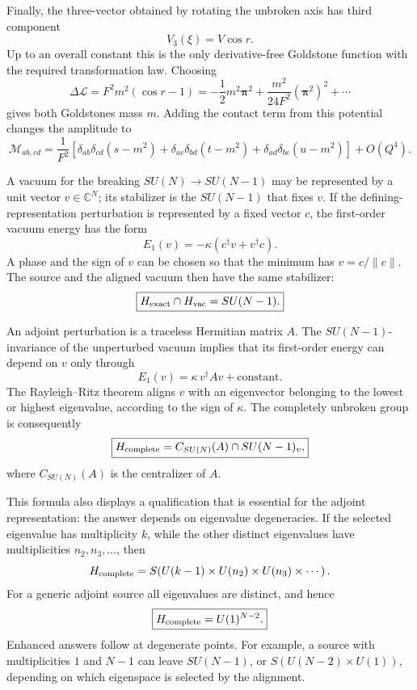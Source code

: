 \begin{enumerate}
  Finally, the three-vector obtained by rotating the unbroken axis has
  third component
  \[
    V_3(\xi)=V\cos r.
  \]
  Up to an overall constant this is the only derivative-free Goldstone
  function with the required transformation law.  Choosing
  \[
    \Delta\mathcal L=F^2m^2(\cos r-1)
      =-\frac12m^2\boldsymbol\pi^2
       +\frac{m^2}{24F^2}(\boldsymbol\pi^2)^2+\cdots
  \]
  gives both Goldstones mass \(m\).  Adding the contact term from this
  potential changes the amplitude to
  \[
    \boxed{\mathcal M_{ab,cd}
      =\frac1{F^2}\left[
       \delta_{ab}\delta_{cd}(s-m^2)
       +\delta_{ac}\delta_{bd}(t-m^2)
       +\delta_{ad}\delta_{bc}(u-m^2)\right]+O(Q^4).}
  \]

  A vacuum for the breaking \(SU(N)\to SU(N-1)\) may be represented by a
  unit vector \(v\in\mathbb C^N\); its stabilizer is the \(SU(N-1)\) that
  fixes \(v\).  If the defining-representation perturbation is represented
  by a fixed vector \(c\), the first-order vacuum energy has the form
  \[
    E_1(v)=-\kappa(c^\dagger v+v^\dagger c).
  \]
  A phase and the sign of \(v\) can be chosen so that the minimum has
  \(v=c/\lVert c\rVert\).  The source and the aligned vacuum then have the
  same stabilizer:
  \[
    \boxed{H_{\rm exact}\cap H_{\rm vac}=SU(N-1).}
  \]

  An adjoint perturbation is a traceless Hermitian matrix \(A\).  The
  \(SU(N-1)\)-invariance of the unperturbed vacuum implies that its
  first-order energy can depend on \(v\) only through
  \[
    E_1(v)=\kappa\,v^\dagger A v+\text{constant}.
  \]
  The Rayleigh--Ritz theorem aligns \(v\) with an eigenvector belonging to
  the lowest or highest eigenvalue, according to the sign of \(\kappa\).
  The completely unbroken group is consequently
  \[
    \boxed{H_{\rm complete}=C_{SU(N)}(A)\cap SU(N-1)_v,}
  \]
  where \(C_{SU(N)}(A)\) is the centralizer of \(A\).

  This formula also displays a qualification that is essential for the
  adjoint representation: the answer depends on eigenvalue degeneracies.
  If the selected eigenvalue has multiplicity \(k\), while the other
  distinct eigenvalues have multiplicities \(n_2,n_3,\ldots\), then
  \[
    H_{\rm complete}
      =S\!\left(U(k-1)\times U(n_2)\times U(n_3)\times\cdots\right).
  \]
  For a generic adjoint source all eigenvalues are distinct, and hence
  \[
    \boxed{H_{\rm complete}=U(1)^{N-2}.}
  \]
  Enhanced answers follow at degenerate points.  For example, a source
  with multiplicities \(1\) and \(N-1\) can leave \(SU(N-1)\), or
  \(S(U(N-2)\times U(1))\), depending on which eigenspace is selected by
  the alignment.


\end{enumerate}
